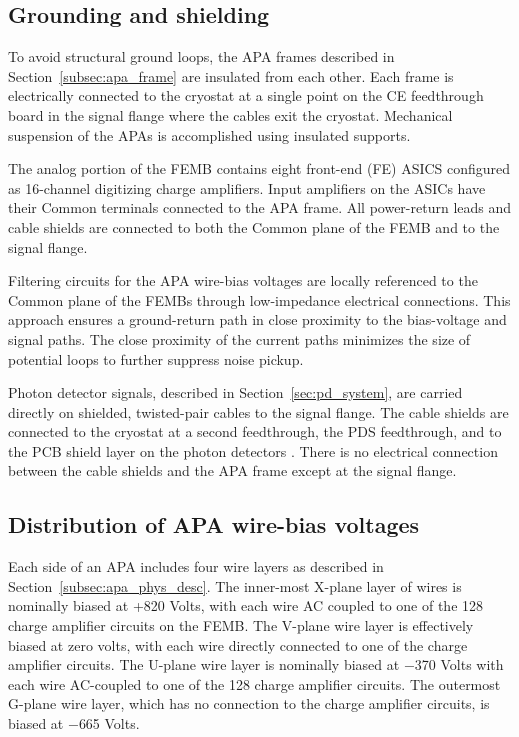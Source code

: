\subsection{Grounding and shielding}
\label{subsec:groundshield}

To avoid structural ground loops, the APA frames described in Section~\ref{subsec:apa_frame} 
are insulated from each other. Each frame is electrically connected to the cryostat at a single 
point on the CE feedthrough board in the signal flange where the cables exit the cryostat. Mechanical suspension of the APAs 
is accomplished using insulated supports. 

The analog portion of the FEMB contains eight front-end (FE) ASICS configured as 16-channel 
digitizing charge amplifiers. Input amplifiers on the ASICs have their Common terminals connected 
to the APA frame.  All power-return leads and cable shields 
are connected to both the Common plane of the FEMB and to the signal flange.

Filtering circuits for the APA wire-bias voltages are locally referenced to the Common plane of the FEMBs through low-impedance 
electrical connections. This approach ensures a ground-return path in close proximity to the 
bias-voltage and signal paths. The close proximity of the current paths minimizes the size of potential loops to further 
suppress noise pickup.

Photon detector signals, described in Section~\ref{sec:pd_system}, are carried directly on shielded, 
twisted-pair cables to the signal flange. The cable shields are connected to the 
cryostat at a second feedthrough, the PDS feedthrough, and to the PCB shield layer on the photon detectors . There is no 
electrical connection between the cable shields and the APA frame except at the signal flange.

%
\subsection{Distribution of APA wire-bias voltages}
\label{subsec:ce_wire_bias}

Each side of an APA includes four wire layers as described in Section~\ref{subsec:apa_phys_desc}. 
The inner-most X-plane layer of wires is nominally biased at +820 Volts, with each wire AC coupled 
to one of the 128 charge amplifier circuits on the FEMB. The V-plane wire layer is effectively biased at zero volts, 
with each wire directly connected to one of the charge amplifier circuits. The U-plane wire layer is nominally 
biased at $-$370 Volts with each wire AC-coupled 
to one of the 128 charge amplifier circuits. The outermost G-plane wire layer,
which has no connection to the charge amplifier circuits, is biased at $-$665 Volts.

